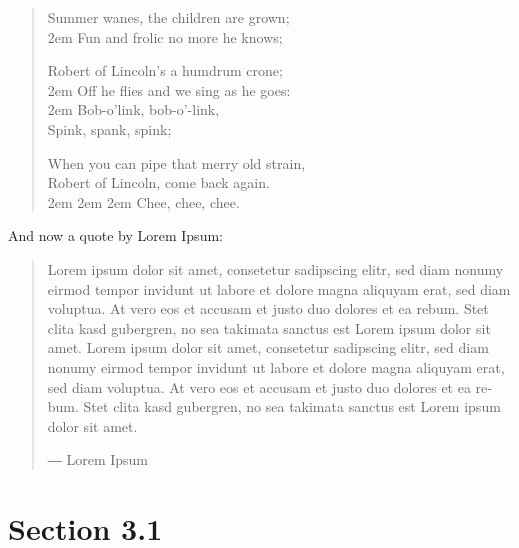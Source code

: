 \documentclass[a5paper]{book}
\begin{document}
\begin{german}
\begin{container}
\begin{center}
\begin{verse}
Summer wanes, the children are grown; \\
{\advance\leftskip2em{}
Fun and frolic no more he knows; \\}

Robert of Lincoln’s a humdrum crone; \\
{\advance\leftskip2em{}
Off he flies and we sing as he goes: \\
{\advance\leftskip2em{}
Bob-o’link, bob-o’-link, \\
Spink, spank, spink; \\}}

When you can pipe that merry old strain, \\
Robert of Lincoln, come back again. \\
{\advance\leftskip2em{}
{\advance\leftskip2em{}
{\advance\leftskip2em{}
Chee, chee, chee. \\}}}
\end{verse}
\end{center}
\end{container}

{\noindent}And now a quote by Lorem Ipsum:\par

\begin{quotation}
{\noindent}Lorem ipsum dolor sit amet, consetetur sadipscing elitr, sed diam
nonumy eirmod tempor invidunt ut labore et dolore magna aliquyam
erat, sed diam voluptua. At vero eos et accusam et justo duo dolores
et ea rebum. Stet clita 
kasd gubergren, no sea takimata
sanctus est Lorem ipsum dolor sit amet. Lorem ipsum dolor sit amet,
consetetur sadipscing elitr, sed diam nonumy eirmod tempor invidunt
ut labore et dolore magna aliquyam erat, sed diam voluptua. At vero
eos et accusam et justo duo dolores et ea rebum. Stet clita kasd
gubergren, no sea takimata sanctus est Lorem ipsum dolor sit amet.\par

\nopagebreak

\raggedleft ― Lorem Ipsum\\
\end{quotation}

%
\label{section-3-1}%
\hypertarget{section-3-1}{}%
%
\section*{
Section 3.1}



\end{german}
\end{document}
